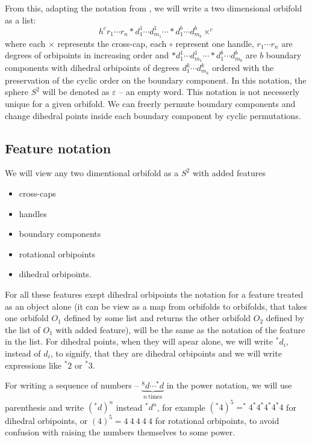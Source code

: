From this, adapting the notation from \cite{Conway2016}, we will write 
a two dimensional 
orbifold as a list: 
\begin{equation}
h^cr_1\cdots r_n 
*d_1^1\cdots d_{m_1}^1 \cdots *d_1^b\cdots d_{m_b}^b\times^c
\end{equation}
where each $\times$ represents the cross-cap, 
each $\circ$ represent one handle, 
$r_1\cdots r_n$ are degrees of orbipoints in increasing order and 
$*d_1^1\cdots d_{m_1}^1 \cdots *d_1^b\cdots d_{m_b}^b$ are $b$ boundary components 
with dihedral orbipoints of degrees $d_1^k\cdots d_{m_k}^k$ ordered with the preservation 
of the cyclic order on the boundary component. 
In this notation, the sphere $S^2$ will be denoted as $\varepsilon$ -- an empty word.
This notation is not necesserly unique for a given orbifold. We can freerly permute 
boundary components and change dihedral points inside each boundary component by cyclic 
permutations. 
\subsection{Feature notation}
We will view any two dimentional orbifold as a $S^2$ with added features
\begin{itemize}
\item cross-caps
\item handles
\item boundary components
\item rotational orbipoints
\item dihedral orbipoints.
\end{itemize}

For all these features exept dihedral orbipoints 
the notation for a feature treated as an object alone (it can be view 
as a map from orbifolds to orbifolds, that takes one orbifold $O_1$ defined by some list and 
returns the other orbifold $O_2$ defined by the list of $O_1$ with added feature), will 
be the same as the notation of the feature in the list. For dihedral points, when they will apear 
alone, we will write $^*d_i$, instead of $d_i$, to signify, that they are dihedral orbipoints 
and we will write expressions like $^*2$ or $^*3$. 

For writing a sequence of numbers -- $\underbrace{^8d\cdots ^*d}_{n\ \mathrm{times}}$ 
in the power notation, we will use 
parenthesis and write $(^*d)^n$ instead $^*d^n$, for example 
$(^*4)^5 = ^*4^*4^*4^*4^*4$ for dihedral 
orbipoints, or $(4)^5 = 4\ 4\ 4\ 4\ 4$ for rotational orbipoints, to avoid confusion with 
raising the numbers themselves to some power. 

